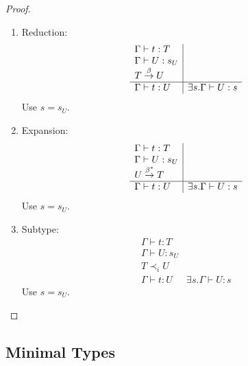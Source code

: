 \begin{theorem}
\begin{proof}
\begin{enumerate}
\begin{enumerate}
                \item Reduction:
                $$
                \begin{array}{l|l}
                    \Gamma \vdash t : T
                    \\
                    \Gamma \vdash U: s_U
                    \\
                    T \stackrel{\beta}{\to} U
                    \\
                    \hline
                    \Gamma \vdash t: U
                    &
                    \exists s. \Gamma \vdash U: s
                \end{array}
                $$
                Use $s = s_U$.

                \item Expansion:
                $$
                \begin{array}{l|l}
                    \Gamma \vdash t : T
                    \\
                    \Gamma \vdash U: s_U
                    \\
                    U \stackrel{\beta^*}{\to} T
                    \\
                    \hline
                    \Gamma \vdash t: U
                    &
                    \exists s. \Gamma \vdash U: s
                \end{array}
                $$
                Use $s = s_U$.

                \item Subtype:
                $$
                \begin{array}{l|l}
                    \Gamma \vdash t : T
                    \\
                    \Gamma \vdash U: s_U
                    \\
                    T \prec_i U
                    \\
                    \hline
                    \Gamma \vdash t: U
                    &
                    \exists s. \Gamma \vdash U: s
                \end{array}
                $$
                Use $s = s_U$.
            \end{enumerate}
        \end{enumerate}
    \end{proof}
\end{theorem}




\subsection{Minimal Types}

